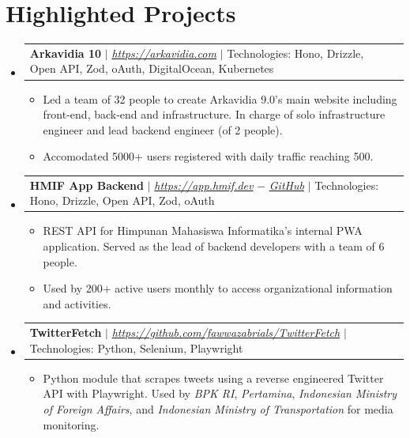 \documentclass[letterpaper,11pt]{article}
\makeatletter
\newcommand{\resumeItem}[1]{
  \item\small{
    {#1 \vspace{-2pt}}
  }
}
\newcommand{\resumeProjectHeading}[2]{
    \vspace{-2pt}\item
    \begin{tabular*}{0.97\textwidth}{l@{\extracolsep{\fill}}r}
      \small#1 & #2 \\
    \end{tabular*}\vspace{-7pt}
}
\newcommand{\resumeSubHeadingListStart}{\begin{itemize}[leftmargin=0.15in, label={}]}
\newcommand{\resumeSubHeadingListEnd}{\end{itemize}}
\newcommand{\resumeItemListStart}{\begin{itemize}}
\newcommand{\resumeItemListEnd}{\end{itemize}\vspace{-5pt}}
\makeatother
\begin{document}
\section{Highlighted Projects}
    \vspace{3pt}
    \resumeSubHeadingListStart
      
    \resumeProjectHeading
        {\textbf{Arkavidia 10} $|$ 
        \emph{\href{https://arkavidia.com/}{\color{blue}https://arkavidia.com}} $|$ 
        Technologies: Hono, Drizzle, Open API, Zod, oAuth, DigitalOcean, Kubernetes}{}
        \resumeItemListStart
            \resumeItem{Led a team of 32 people to create Arkavidia 9.0’s main website including front-end, back-end and infrastructure. In charge of solo infrastructure engineer and lead backend engineer (of 2 people).}
            \resumeItem{Accomodated 5000+ users registered with daily traffic reaching 500.}
        \resumeItemListEnd

    \resumeProjectHeading
        {\textbf{HMIF App Backend} $|$ 
        \emph{\href{https://app.hmif.dev/}{\color{blue}https://app.hmif.dev}} $-$ \emph{\href{https://github.com/hmif-itb/hmif-app-be}{\color{blue}GitHub}} $|$ 
        Technologies: Hono, Drizzle, Open API, Zod, oAuth}{}
        \resumeItemListStart
            \resumeItem{REST API for Himpunan Mahasiswa Informatika’s internal PWA application. Served as the lead of backend developers with a team of 6 people.}
            \resumeItem{Used by 200+ active users monthly to access organizational information and activities.}
        \resumeItemListEnd

    \resumeProjectHeading
        {\textbf{TwitterFetch} $|$ 
        \emph{\href{https://github.com/fawwazabrials/TwitterFetch}{\color{blue}https://github.com/fawwazabrials/TwitterFetch}} $|$ 
        Technologies: Python, Selenium, Playwright}{}
        \resumeItemListStart
            \resumeItem{Python module that scrapes tweets using a reverse engineered Twitter API with Playwright. Used by \emph{BPK RI}, \emph{Pertamina}, \emph{Indonesian Ministry of Foreign Affairs}, and \emph{Indonesian Ministry of Transportation} for media monitoring.}
        \resumeItemListEnd
      
    \resumeSubHeadingListEnd
\end{document}
